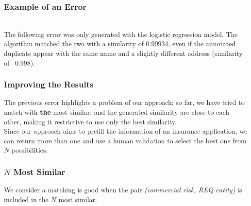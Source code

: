 \documentclass{beamer}
\begin{document}
	\begin{frame}\frametitle{Example of an Error}
	\\\bigskip
		The following error was only generated with the logistic regression model. The algorithm matched the two with a similarity of 0.99934, even if the annotated duplicate appear with the same name and a slightly
		different address (similarity of ~0.998). 
	\end{frame}

	\begin{frame}\frametitle{Improving the Results}
		The previous error highlights a problem of our approach; so far, we have tried to match with \textbf{the} most similar, and the generated similarity are close to each other, making it restrictive to use only the best similarity.
		\\\bigskip
		Since our approach aims to prefill the information of an insurance application, we can return more than one and use a human validation to select the best one from $N$ possibilities.
	\end{frame}

	\begin{frame}\frametitle{$N$ Most Similar}
		We consider a matching is good when the pair \textit{(commercial risk, REQ entity)} is included in the $N$ most similar.
	\end{frame}
\end{document}
